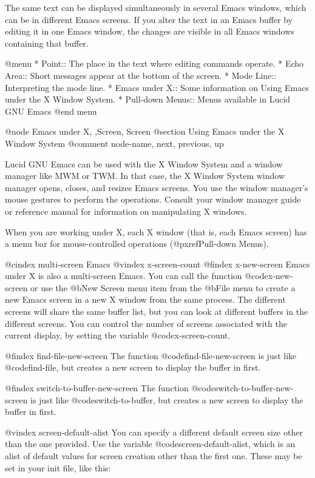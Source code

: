   The same text can be displayed simultaneously in several Emacs
windows, which can be in different Emacs screens.  If you alter the text
in an Emacs buffer by editing it in one Emacs window, the changes are
visible in all Emacs windows containing that buffer.


@menu
* Point::	        The place in the text where editing commands operate.  
* Echo Area::           Short messages appear at the bottom of the screen.  
* Mode Line::	        Interpreting the mode line.  
* Emacs under X::       Some information on Using Emacs under the X 
                        Window System. 
* Pull-down Menus::     Menus available in Lucid GNU Emacs
@end menu


@node Emacs under X, ,Screen, Screen
@section Using Emacs under the X Window System
@comment  node-name,  next,  previous,  up


 Lucid GNU Emacs can be used with the X Window System and a window
manager like MWM or TWM.  In that case, the X Window System window
manager opens, closes, and resizes Emacs screens.  You use the window
manager's mouse gestures to perform the operations.  Consult your window
manager guide or reference manual for information on manipulating X
windows.

When you are working under X, each X window (that is, each Emacs screen)
has a menu bar for mouse-controlled operations (@pxref{Pull-down Menus}).

@cindex multi-screen Emacs
@vindex x-screen-count
@findex x-new-screen
Emacs under X is also a multi-screen Emacs.  You can call the function
@code{x-new-screen} or use the @b{New Screen} menu item from the
@b{File} menu to create a new Emacs screen in a new X window from the
same process.  The different screens will share the same buffer list,
but you can look at different buffers in the different screens. You can
control the number of screens associated with the current display, by
setting the variable @code{x-screen-count}.

@findex find-file-new-screen
The function @code{find-file-new-screen} is just like @code{find-file},
but creates a new screen to display the buffer in first.

@findex switch-to-buffer-new-screen
The function @code{switch-to-buffer-new-screen} is just 
like @code{switch-to-buffer}, but creates a new screen to display 
the buffer in first.

@vindex screen-default-alist
You can specify a different default screen size other than the one
provided. Use the variable @code{screen-default-alist}, which is an
alist of default values for screen creation other than the first one.
These may be set in your init file, like this:

